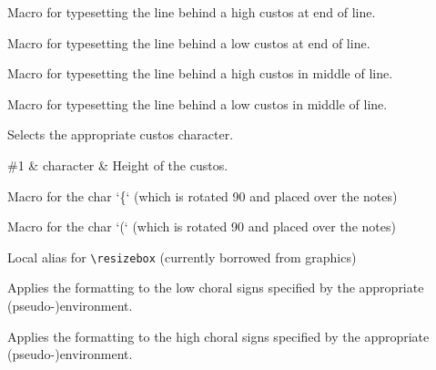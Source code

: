 Macro for typesetting the line behind a high custos at end of line.

Macro for typesetting the line behind a low custos at end of line.

Macro for typesetting the line behind a high custos in middle of line.

Macro for typesetting the line behind a low custos in middle of line.

Selects the appropriate custos character.

\begin{argtable}
  \#1 & character & Height of the custos.\\
\end{argtable}

Macro for the char ‘\{‘ (which is rotated 90 and placed over the
notes)

Macro for the char ‘(‘ (which is rotated 90 and placed over the notes)

Local alias for \verb=\resizebox= (currently borrowed from graphics)

Applies the formatting to the low choral signs specified by the
appropriate (pseudo-)environment.

Applies the formatting to the high choral signs specified by the
appropriate (pseudo-)environment.

